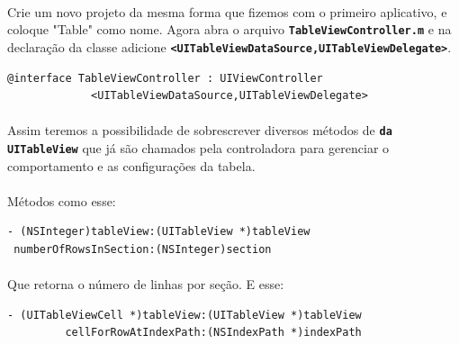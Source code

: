 \documentclass[a4paper,12pt,brazil,doubleside]{book}
\begin{document}
\pagebreak

\paragraph{}Crie um novo projeto da mesma forma que fizemos com o primeiro aplicativo, e coloque "Table" como nome. Agora abra o arquivo \texttt{\textbf{TableViewController.m}} e na declaração da classe adicione \texttt{\textbf{<UITableViewDataSource,UITableViewDelegate>}}.

\begin{listing}
\begin{verbatim}
@interface TableViewController : UIViewController
             <UITableViewDataSource,UITableViewDelegate>
\end{verbatim}
\end{listing}

\paragraph{}Assim teremos a possibilidade de sobrescrever diversos métodos de \texttt{\textbf{da UITableView}} que já são chamados pela controladora para gerenciar o comportamento e as configurações da tabela.
\paragraph{}Métodos como esse:

\begin{listing}
\begin{verbatim}
- (NSInteger)tableView:(UITableView *)tableView
 numberOfRowsInSection:(NSInteger)section
\end{verbatim}
\end{listing}

\paragraph{}Que retorna o número de linhas por seção. E esse:

\begin{listing}
\begin{verbatim}
- (UITableViewCell *)tableView:(UITableView *)tableView
         cellForRowAtIndexPath:(NSIndexPath *)indexPath
\end{verbatim}
\end{listing}
\end{document}
